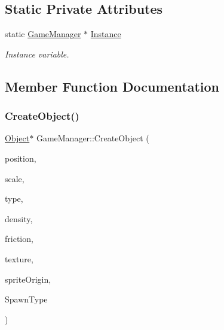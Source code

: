 \subsection*{Static Private Attributes}
\begin{DoxyCompactItemize}
\item 
\mbox{\label{class_game_manager_a8f823a490b0110b09be5bd8badbf792a}} 
static \hyperlink{class_game_manager}{Game\+Manager} $\ast$ \hyperlink{class_game_manager_a8f823a490b0110b09be5bd8badbf792a}{Instance}
\begin{DoxyCompactList}\small\item\em Instance variable. \end{DoxyCompactList}\end{DoxyCompactItemize}


\subsection{Member Function Documentation}
\mbox{\label{class_game_manager_acc61ce12b7ed93580b4a585389bcc968}} 
\subsubsection{\texorpdfstring{Create\+Object()}{CreateObject()}}
{\footnotesize\ttfamily \hyperlink{class_object}{Object}$\ast$ Game\+Manager\+::\+Create\+Object (\begin{DoxyParamCaption}\item[{\hyperlink{struct_vec2}{Vec2}}]{position,  }\item[{\hyperlink{struct_vec2}{Vec2}}]{scale,  }\item[{Body\+Type}]{type,  }\item[{float32}]{density,  }\item[{float32}]{friction,  }\item[{char $\ast$}]{texture,  }\item[{\hyperlink{struct_vec2}{Vec2}}]{sprite\+Origin,  }\item[{Define\+Type}]{Spawn\+Type }\end{DoxyParamCaption})}

